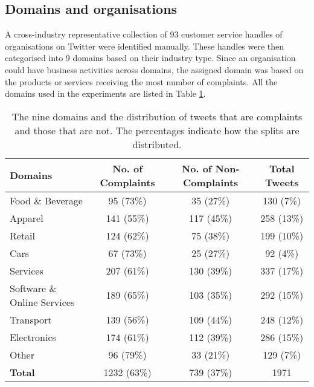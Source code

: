 \subsection{Domains and organisations}
A cross-industry representative collection of 93 customer service handles of organisations on Twitter were identified manually. These handles were then categorised into 9 domains based on their industry type. Since an organisation could have business activities across domains, the assigned domain was based on the products or services receiving the most number of complaints. All the domains used in the experiments are listed in Table \ref{tab: domains}. 
\begin{table}[ht]
    \centering
    \begin{tabular}{|l|c|c|c|}
    \hline
    \rowcolor[gray]{0.7}
    \textbf{Domains} & \textbf{No. of Complaints} & \textbf{No. of Non-Complaints} & \textbf{Total Tweets}\\
    \hline
    Food \& Beverage & 95 (73\%) & 35 (27\%) & 130 (7\%)\\
    \rowcolor[gray]{0.9}
    Apparel & 141 (55\%) & 117 (45\%) & 258 (13\%)\\
    Retail & 124 (62\%)& 75 (38\%) & 199 (10\%)\\
    \rowcolor[gray]{0.9}
    Cars & 67 (73\%)& 25 (27\%) & 92 (4\%)\\
    Services  & 207 (61\%)& 130 (39\%) & 337 (17\%)\\
    \rowcolor[gray]{0.9}
    Software \& Online Services & 189 (65\%)& 103 (35\%) & 292 (15\%)\\
    Transport & 139 (56\%)& 109 (44\%) & 248 (12\%)\\
    \rowcolor[gray]{0.9}
    Electronics & 174 (61\%)& 112 (39\%) & 286 (15\%)\\
    Other & 96 (79\%)& 33 (21\%) & 129 (7\%)\\
    \hline
    \rowcolor[gray]{0.9}
    \textbf{Total} & 1232 (63\%)& 739 (37\%) & 1971\\
    \hline
    \end{tabular}
    \caption{The nine domains and the distribution of tweets that are complaints and those that are not. The percentages indicate how the splits are distributed.}    
    \label{tab: domains}
\end{table}  

